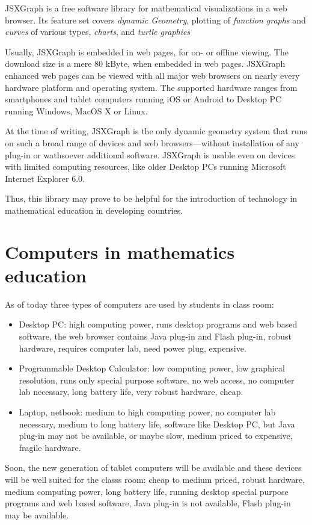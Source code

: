 \documentclass[12pt,a4paper]{article}%
\begin{document}
JSXGraph is a free software library for mathematical visualizations in a web browser.
Its feature set covers {\sl dynamic Geometry}, plotting of {\sl function graphs} and
{\sl curves} of various types, {\sl charts}, and {\sl turtle graphics}

Usually, JSXGraph is embedded in web pages, for on- or off\/line viewing.
The download size is a mere 80 kByte, when embedded in web pages.
JSXGraph enhanced web pages can be viewed with all major web browsers 
on nearly every hardware platform and operating system.
The supported hardware ranges from smartphones and tablet computers 
running iOS or Android to Desktop PC running Windows, MacOS X or Linux.

At the time of writing, JSXGraph is the only dynamic geometry system that runs  
on such a broad range of  devices and web browsers---without installation of any plug-in 
or wathsoever additional software.
JSXGraph is usable even on devices with limited computing resources, 
like older Desktop PCs running Microsoft Internet Explorer 6.0. 

Thus, this library may prove to be helpful for the
introduction of technology in mathematical education in developing countries.

\section{Computers in mathematics education}
As of today three types of computers are used by students in class room:
\begin{itemize}
\item Desktop PC: high computing power, runs desktop programs and web based software, 
the web browser contains Java plug-in and Flash plug-in, robust hardware,
requires computer lab, need power plug, expensive.
\item Programmable Desktop Calculator: low computing power, low graphical resolution, runs only
special purpose software, no web access, no computer lab necessary, long battery life, 
very robust hardware, cheap.
\item Laptop, netbook: medium to high computing power, no computer lab necessary, 
medium to long battery life, software like Desktop PC, but Java plug-in may not be available, or maybe slow,
medium priced to expensive, fragile hardware.
\end{itemize}
Soon, the new generation of tablet computers will be available and these devices will be
well suited for the classs room: cheap to medium priced, robust hardware, medium
computing power, long battery life, running desktop special purpose programs and web based software,
Java plug-in is not available, Flash plug-in may be available.
\end{document}

